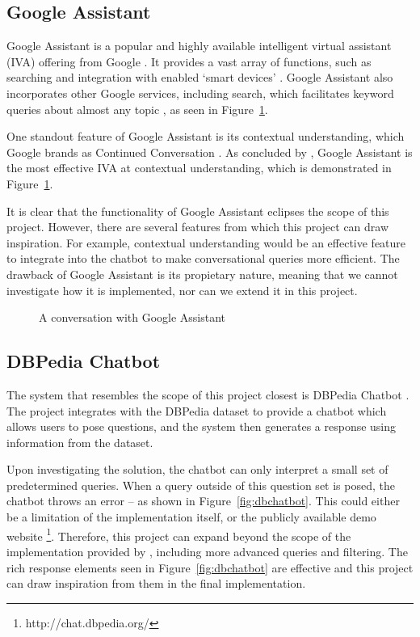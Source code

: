 \subsection{Google Assistant}
Google Assistant is a popular and highly available intelligent virtual assistant (IVA) offering from Google \cite{lopez2017alexa}. It provides a vast array of functions, such as searching and integration with enabled `smart devices' \cite{googleassistant}. Google Assistant also incorporates other Google services, including search, which facilitates keyword queries about almost any topic \cite{michaely2017keyword}, as seen in Figure~\ref{fig:assistant}.

One standout feature of Google Assistant is its contextual understanding, which Google brands as Continued Conversation \cite{paplauskaite2016}. As concluded by \citet{tulshan2019survey}, Google Assistant is the most effective IVA at contextual understanding, which is demonstrated in Figure~\ref{fig:assistant}.

It is clear that the functionality of Google Assistant eclipses the scope of this project. However, there are several features from which this project can draw inspiration. For example, contextual understanding would be an effective feature to integrate into the chatbot to make conversational queries more efficient. The drawback of Google Assistant is its propietary nature, meaning that we cannot investigate how it is implemented, nor can we extend it in this project.

\begin{figure}[h]
	\centering
    \qquad
	\caption{A conversation with Google Assistant}
	\label{fig:assistant}
\end{figure}

\newpage
\subsection{DBPedia Chatbot}
\label{sec:dbchatbot}
The system that resembles the scope of this project closest is DBPedia Chatbot \cite{ramngongausbeck2018}. The project integrates with the DBPedia dataset to provide a chatbot which allows users to pose questions, and the system then generates a response using information from the dataset.

Upon investigating the solution, the chatbot can only interpret a small set of predetermined queries. When a query outside of this question set is posed, the chatbot throws an error -- as shown in Figure~\ref{fig:dbchatbot}. This could either be a limitation of the implementation itself, or the publicly available demo website \footnote{http://chat.dbpedia.org/}. Therefore, this project can expand beyond the scope of the implementation provided by \citet{ramngongausbeck2018}, including more advanced queries and filtering. The rich response elements seen in Figure~\ref{fig:dbchatbot} are effective and this project can draw inspiration from them in the final implementation.

